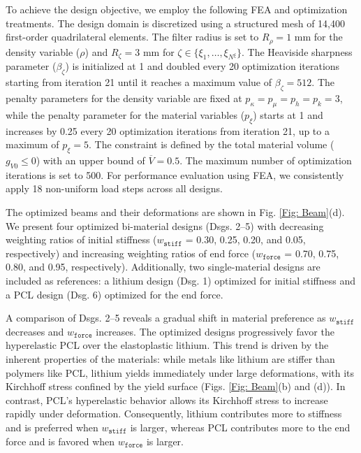 \documentclass[preprint,11pt]{elsarticle}
\theoremstyle{definition}
\begin{document}
To achieve the design objective, we employ the following FEA and optimization treatments. The design domain is discretized using a structured mesh of 14,400 first-order quadrilateral elements. The filter radius is set to $R_\rho=1$ mm for the density variable ($\rho$) and $R_\zeta = 3$ mm for $\zeta \in \{ \xi_1, \ldots, \xi_{N^\xi} \}$. The Heaviside sharpness parameter ($\beta_\zeta$) is initialized at 1 and doubled every 20 optimization iterations starting from iteration 21 until it reaches a maximum value of $\beta_\zeta = 512$. The penalty parameters for the density variable are fixed at $p_\kappa = p_\mu = p_h = p_k = 3$, while the penalty parameter for the material variables ($p_\xi$) starts at 1 and increases by 0.25 every 20 optimization iterations from iteration 21, up to a maximum of $p_\xi = 5$. The constraint is defined by the total material volume ($g_{V0} \leq 0$) with an upper bound of $\overline{V} = 0.5$. The maximum number of optimization iterations is set to 500. For performance evaluation using FEA, we consistently apply 18 non-uniform load steps across all designs.

The optimized beams and their deformations are shown in Fig. \ref{Fig: Beam}(d). We present four optimized bi-material designs (Dsgs. 2--5) with decreasing weighting ratios of initial stiffness ($w_\texttt{stiff}$ = 0.30, 0.25, 0.20, and 0.05, respectively) and increasing weighting ratios of end force ($w_\texttt{force}$ = 0.70, 0.75, 0.80, and 0.95, respectively). Additionally, two single-material designs are included as references: a lithium design (Dsg. 1) optimized for initial stiffness and a PCL design (Dsg. 6) optimized for the end force.

A comparison of Dsgs. 2--5 reveals a gradual shift in material preference as $w_\texttt{stiff}$ decreases and $w_\texttt{force}$ increases. The optimized designs progressively favor the hyperelastic PCL over the elastoplastic lithium. This trend is driven by the inherent properties of the materials: while metals like lithium are stiffer than polymers like PCL, lithium yields immediately under large deformations, with its Kirchhoff stress confined by the yield surface (Figs. \ref{Fig: Beam}(b) and (d)). In contrast, PCL’s hyperelastic behavior allows its Kirchhoff stress to increase rapidly under deformation. Consequently, lithium contributes more to stiffness and is preferred when $w_\texttt{stiff}$ is larger, whereas PCL contributes more to the end force and is favored when $w_\texttt{force}$ is larger.
\end{document}
